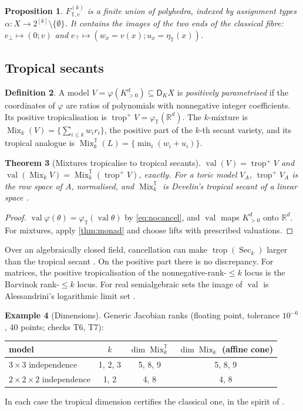 \documentclass[11pt]{article}
\newtheorem{theorem}{Theorem}[section]
\newtheorem{proposition}[theorem]{Proposition}
\theoremstyle{definition}
\newtheorem{definition}[theorem]{Definition}
\newtheorem{example}[theorem]{Example}
\newcommand{\DK}{\mathsf D_{K}}
\newcommand{\T}{\mathbb T}
\newcommand{\R}{\mathbb R}
\newcommand{\ebot}{e_{\perp}}
\newcommand{\etop}{e_{\top}}
\newcommand{\val}{\operatorname{val}}
\newcommand{\trop}{\operatorname{trop}}
\newcommand{\Mix}{\operatorname{Mix}}
\newcommand{\Sec}{\operatorname{Sec}}
\begin{document}
\begin{proposition}\label{prop:fibrepoly}
$F^{(k)}_{\T,v}$ is a finite union of polyhedra, indexed by assignment types $\alpha\colon X\to2^{[k]}\setminus\{\emptyset\}$. It
contains the images of the two ends of the classical fibre: $\ebot\mapsto(0;v)$ and $\etop\mapsto(w_x=v(x);u_x=\eta_\T(x))$.
\end{proposition}

\subsection{Tropical secants}
\begin{definition}
A model $V=\varphi(K^d_{>0})\subseteq\DK X$ is \emph{positively parametrised} if the coordinates of $\varphi$ are ratios of
polynomials with nonnegative integer coefficients. Its positive tropicalisation is $\trop^+V=\varphi_\T(\R^d)$. The $k$-mixture is
$\Mix_k(V)=\{\sum_{i\le k}w_ir_i\}$, the positive part of the $k$-th secant variety, and its tropical analogue is
$\Mix^\T_k(L)=\{\min_i(w_i+u_i)\}$.
\end{definition}

\begin{theorem}[Mixtures tropicalise to tropical secants]\label{thm:secant}
$\val(V)=\trop^+V$ and $\val(\Mix_k V)=\Mix^\T_k(\trop^+V)$, exactly. For a toric model $V_A$, $\trop^+V_A$ is the row space of $A$,
normalised, and $\Mix^\T_k$ is Develin's tropical secant of a linear space \cite{Develin2006}.
\end{theorem}
\begin{proof}
$\val\varphi(\theta)=\varphi_\T(\val\theta)$ by \eqref{eq:nocancel}, and $\val$ maps $K^d_{>0}$ onto $\R^d$. For mixtures, apply
\cref{thm:monad} and choose lifts with prescribed valuations.
\end{proof}

Over an algebraically closed field, cancellation can make $\trop(\Sec_k)$ larger than the tropical secant
\cite{Develin2006,DevelinSantosSturmfels2005}. On the positive part there is no discrepancy. For matrices, the positive
tropicalisation of the nonnegative-rank-$\le k$ locus is the Barvinok rank-$\le k$ locus. For real semialgebraic sets the image of
$\val$ is Alessandrini's logarithmic limit set \cite{Alessandrini2013}.

\begin{example}[Dimensions]\label{ex:dims}
Generic Jacobian ranks (floating point, tolerance $10^{-6}$, 40 points; checks T6, T7):
\begin{center}
\begin{tabular}{lccc}\toprule
model & $k$ & $\dim\Mix^\T_k$ & $\dim\Mix_k$ (affine cone)\\\midrule
$3\times3$ independence & 1, 2, 3 & 5, 8, 9 & 5, 8, 9\\
$2\times2\times2$ independence & 1, 2 & 4, 8 & 4, 8\\\bottomrule
\end{tabular}
\end{center}
In each case the tropical dimension certifies the classical one, in the spirit of \cite{Draisma2008}.
\end{example}
\end{document}
